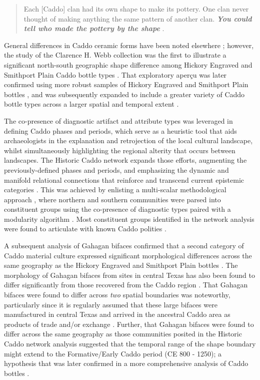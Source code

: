 \documentclass[smallextended]{svjour3}       %
\begin{document}
\begin{quote}
Each {[}Caddo{]} clan had its own shape to make its pottery. One clan
never thought of making anything the same pattern of another clan.
\emph{\textbf{You could tell who made the pottery by the shape}}
\cite[395]{RN9357x}.
\end{quote}

General differences in Caddo ceramic forms have been noted elsewhere
\cite{RN5650,RN7162}; however, the study of the Clarence H. Webb
collection was the first to illustrate a significant north-south
geographic shape difference among Hickory Engraved and Smithport Plain
Caddo bottle types \cite{RN8370}. That exploratory aperçu was later
confirmed using more robust samples of Hickory Engraved and Smithport
Plain bottles \cite{RN8074,RN7927}, and was subsequently expanded to
include a greater variety of Caddo bottle types across a larger spatial
and temporal extent \cite{RN8312}.

The co-presence of diagnostic artifact and attribute types was leveraged
in defining Caddo phases and periods, which serve as a heuristic tool
that aids archaeologists in the explanation and retrojection of the
local cultural landscape, whilst simultaneously highlighting the
regional alterity that occurs between landscapes. The Historic Caddo
network expands those efforts, augmenting the previously-defined phases
and periods, and emphasizing the dynamic and manifold relational
connections that reinforce and transcend current epistemic categories
\cite{RN8031}. This was achieved by enlisting a multi-scalar
methodological approach \cite{RN5644,RN8039}, where northern and
southern communities were parsed into constituent groups using the
co-presence of diagnostic types paired with a modularity algorithm
\cite{RN8051,RN8024}. Most constituent groups identified in the network
analysis were found to articulate with known Caddo polities
\cite{RN8031}.

A subsequent analysis of Gahagan bifaces confirmed that a second
category of Caddo material culture expressed significant morphological
differences across the same geography as the Hickory Engraved and
Smithport Plain bottles \cite{RN8158}. The morphology of Gahagan bifaces
from sites in central Texas has also been found to differ significantly
from those recovered from the Caddo region \cite{RN8322}. That Gahagan
bifaces were found to differ across \emph{two} spatial boundaries was
noteworthy, particularly since it is regularly assumed that these large
bifaces were manufactured in central Texas and arrived in the ancestral
Caddo area as products of trade and/or exchange \cite{RN8322,RN8158}.
Further, that Gahagan bifaces were found to differ across the same
geography as those communities posited in the Historic Caddo network
analysis suggested that the temporal range of the shape boundary might
extend to the Formative/Early Caddo period (CE 800 - 1250); a hypothesis
that was later confirmed in a more comprehensive analysis of Caddo
bottles \cite{RN8312}.
\end{document}
